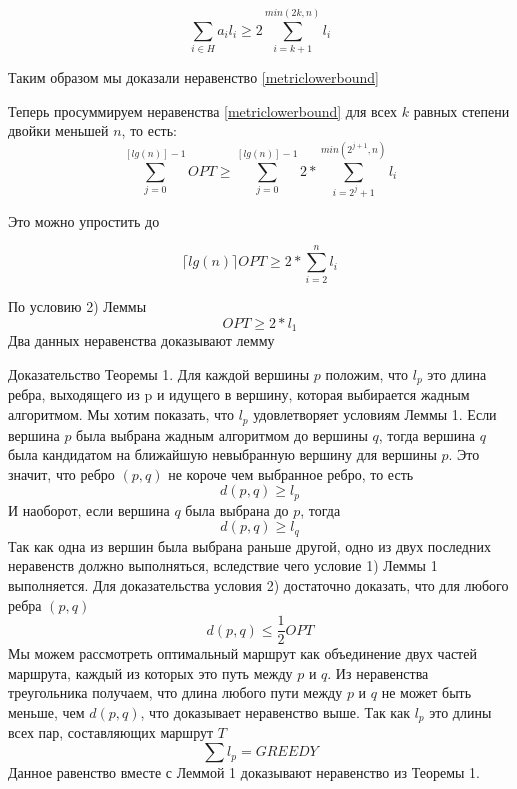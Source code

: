 \documentclass[a4paper, 14pt]{extarticle}
\begin{document}
\begin{equation}
	\sum_{i \in H} a_i l_i \geq 2 \sum_{i=k+1}^{min(2k, n)} l_i
	\label{sum}
\end{equation}

Таким образом мы доказали неравенство \ref{metriclowerbound}

Теперь просуммируем неравенства \ref{metriclowerbound} для всех $k$ равных степени двойки меньшей $n$, то есть:
\begin{equation}
\sum_{j=0}^{[lg(n)]-1} OPT \geq \sum_{j=0}^{[lg(n)]-1} 2* \sum_{i=2^j+1}^{min(2^{j+1}, n)} l_i
\end{equation}

Это можно упростить до

\begin{equation}
\lceil lg(n) \rceil OPT \geq 2* \sum_{i=2}^{n} l_i
\end{equation}

По условию 2) Леммы
\begin{equation}
OPT \geq 2*l_1
\end{equation}
Два данных неравенства доказывают лемму

Доказательство Теоремы 1. Для каждой  вершины $p$ положим, что $l_p$ это длина ребра, выходящего из p и идущего в вершину, которая выбирается жадным алгоритмом. Мы хотим показать, что $l_p$ удовлетворяет условиям Леммы 1. Если вершина $p$ была выбрана жадным алгоритмом до вершины $q$, тогда вершина $q$ была кандидатом на ближайшую невыбранную вершину для вершины $p$. Это значит, что ребро $(p,q)$ не короче чем выбранное ребро, то есть
\begin{equation}
d(p,q) \geq l_p
\end{equation}
И наоборот, если вершина $q$ была выбрана до $p$, тогда
\begin{equation}
d(p,q) \geq l_q
\end{equation}
Так как одна из вершин была выбрана раньше другой, одно из двух последних неравенств должно выполняться, вследствие чего  условие 1) Леммы 1 выполняется. Для доказательства условия 2) достаточно доказать, что для любого ребра $(p,q)$
\begin{equation}
d(p,q) \leq \frac{1}{2}OPT
\end{equation}
Мы можем рассмотреть оптимальный маршрут как объединение двух частей маршрута, каждый из которых это путь между $p$ и $q$. Из неравенства треугольника получаем, что длина любого пути между $p$ и $q$ не может быть меньше, чем $d(p,q)$, что доказывает неравенство выше. Так как $l_p$ это длины всех пар, составляющих маршрут $T$
\begin{equation}
\sum l_p = GREEDY
\end{equation}
Данное равенство вместе с Леммой 1 доказывают неравенство из Теоремы 1.
\end{document}
